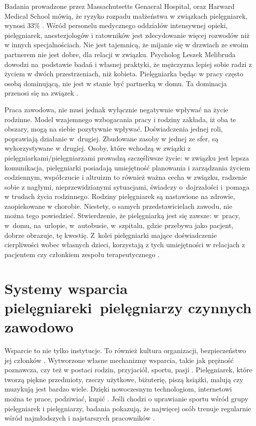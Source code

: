 \documentclass[a4paper,12pt,twoside,openright]{mwrep}
\begin{document}
Badania prowadzone przez Massachutsetts Genaeral Hospital, oraz Harward Medical School mówią, że ryzyko rozpadu małżeństwa w związkach pielęgniarek, wynosi 33\% \cite{rozwody}. Wśród personelu medycznego oddziałów intensywnej opieki, pielęgniarek, anestezjologów i ratowników jest zdecydowanie więcej rozwodów niż w innych specjalnościach.  Nie jest tajemnicą, że mijanie się w drzwiach ze swoim partnerem nie jest dobre, dla relacji w związku. Psycholog Leszek Melibruda dowodzi na~podstawie badań i własnej praktyki, że mężczyzna lepiej sobie radzi z życiem w dwóch przestrzeniach, niż kobieta. Pielęgniarka będąc w pracy często osobą dominującą, nie jest w stanie być partnerką w domu. Ta dominacja przenosi się na związek \cite{melibruda}.

Praca zawodowa, nie musi jednak wyłącznie negatywnie wpływać na życie rodzinne. Model wzajemnego wzbogacania pracy i rodziny zakłada, iż oba te obszary, mogą na siebie pozytywnie wpływać. Doświadczenia jednej roli, poprawiają działanie w~drugiej. Zbudowane zasoby w jednej ze sfer, są wykorzystywane w drugiej.  Osoby, które wchodzą w związki z pielęgniarkami/pielęgniarzami prowadzą szczęśliwsze życie: w związku jest lepsza komunikacja, pielęgniarki posiadają umiejętność planowania i zarządzania życiem codziennym, współczucie i altruizm to również ważna cecha w związku, radzenie sobie z nagłymi, nieprzewidzianymi sytuacjami, świadczy o~dojrzałości i~pomaga w trudach życia rodzinnego. Rodziny pielęgniarek są nastawione na zdrowie, zaopiekowane w chorobie. Niestety, o samych przedstawicielach zawodu, nie można tego powiedzieć. Stwierdzenie, że pielęgniarką jest się zawsze: w~pracy, w~domu, na~urlopie, w~autobusie, w~szpitalu, gdzie przebywa jako pacjent, dobrze obrazuje, tę kwestię. Z~kolei pielęgniarki mające doświadczenie cierpliwości wobec własnych dzieci, korzystają z tych umiejętności w relacjach z pacjentem czy członkiem zespołu terapeutycznego \cite{wzbogacanie}.

\section{Systemy wsparcia pielęgniarek\newline i~pielęgniarzy czynnych zawodowo}
\label{sectionSystemyWsparcia}
Wsparcie to nie tylko instytucje. To również kultura organizacji, bezpieczeństwo jej członków \cite{bezpieczenstwo}. Wytworzone własne mechanizmy wsparcia, takie jak  prężność poznawcza, czy też w postaci  rodzin, przyjaciół, sportu, pasji \cite{preznosc}. Pielęgniarek, które tworzą piękne przedmioty, rzeczy użytkowe, biżuterię, piszą książki, malują czy muzykują  jest bardzo wiele. Dzięki nowoczesnym technologiom, internetowi można te prace, podziwiać, kupić \cite{talent}. Jeśli chodzi o uprawianie sportu wśród grupy pielęgniarek i pielęgniarzy, badania pokazują, że najwięcej osób trenuje regularnie wśród najmłodszych i najstarszych pracowników \cite{sport}.
\end{document}

